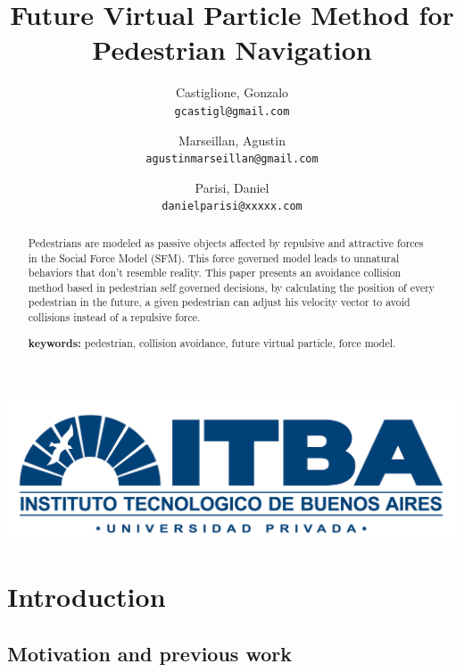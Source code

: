 \documentclass[english]{article}
\begin{document}
\title{Future Virtual Particle Method for Pedestrian Navigation}

\author{
  Castiglione, Gonzalo\\
  \texttt{gcastigl@gmail.com}
  \and
  Marseillan, Agustin\\
  \texttt{agustinmarseillan@gmail.com}
  \and
  Parisi, Daniel\\
  \texttt{danielparisi@xxxxx.com}
}
\date{}

\maketitle

\vspace{10cm}
\begin{center}
    \includegraphics[scale=0.08]{pics/ITBA}
    \par
\end{center}

\pagebreak{}

\begin{abstract}
Pedestrians are modeled as passive objects affected by repulsive and
attractive forces in the Social Force Model (SFM). This force governed
model leads to unnatural behaviors that don't resemble reality. This
paper presents an avoidance collision method based in pedestrian self
governed decisions, by calculating the position of every pedestrian
in the future, a given pedestrian can adjust his velocity vector to
avoid collisions instead of a repulsive force. 

\textbf{keywords:} pedestrian, collision avoidance, future virtual
particle, force model.
\end{abstract}

\section{Introduction}


\subsection{Motivation and previous work}
\end{document}
